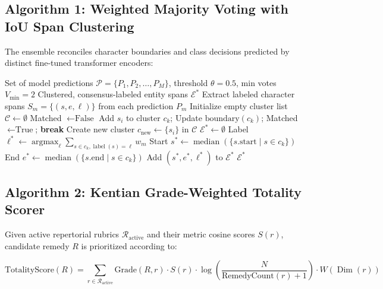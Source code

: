 \subsection{Algorithm 1: Weighted Majority Voting with IoU Span Clustering}
The ensemble reconciles character boundaries and class decisions predicted by distinct fine-tuned transformer encoders:

\begin{algorithm}[H]
\caption{Weighted Majority Voting and Span Clustering}
\label{alg:ensemble}
\begin{algorithmic}[1]
\Require Set of model predictions $\mathcal{P} = \{P_1, P_2, \ldots, P_M\}$, threshold $\theta = 0.5$, min votes $V_{\min} = 2$
\Ensure Clustered, consensus-labeled entity spans $\mathcal{E}^*$
\State Extract labeled character spans $S_m = \{(s, e, \ell)\}$ from each prediction $P_m$
\State Initialize empty cluster list $\mathcal{C} \gets \emptyset$
    \State Matched $\gets \text{False}$
            \State Add $s_i$ to cluster $c_k$; Update $\text{boundary}(c_k)$; Matched $\gets \text{True}$; \textbf{break}
        \EndIf
    \EndFor
        \State Create new cluster $c_{\text{new}} \gets \{s_i\}$ in $\mathcal{C}$
    \EndIf
\EndFor
\State $\mathcal{E}^* \gets \emptyset$
        \State Label $\ell^* \gets \operatorname{argmax}_{\ell} \sum_{s \in c_k, \operatorname{label}(s)=\ell} w_m$
        \State Start $s^* \gets \operatorname{median}(\{s.\text{start} \mid s \in c_k\})$
        \State End $e^* \gets \operatorname{median}(\{s.\text{end} \mid s \in c_k\})$
        \State Add $(s^*, e^*, \ell^*)$ to $\mathcal{E}^*$
    \EndIf
\EndFor
\State \Return $\mathcal{E}^*$
\end{algorithmic}
\end{algorithm}

\subsection{Algorithm 2: Kentian Grade-Weighted Totality Scorer}
Given active repertorial rubrics $\mathcal{R}_{\text{active}}$ and their metric cosine scores $S(r)$, candidate remedy $R$ is prioritized according to:

\begin{equation}
\text{TotalityScore}(R) = \sum_{r \in \mathcal{R}_{\text{active}}} \text{Grade}(R, r) \cdot S(r) \cdot \log\left(\frac{N}{\text{RemedyCount}(r) + 1}\right) \cdot W(\operatorname{Dim}(r))
\label{eq:totality_exact}
\end{equation}

